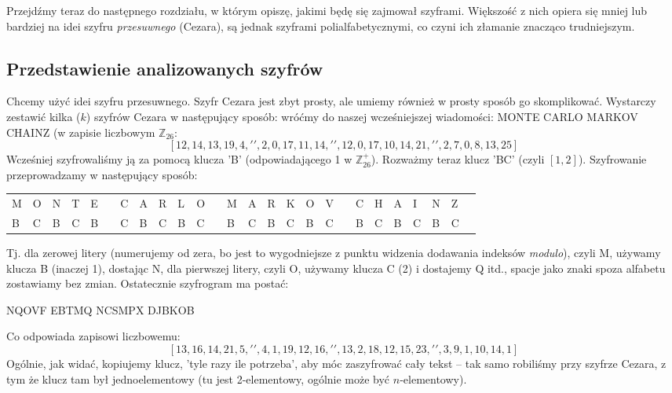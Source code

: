 \documentclass[a4paper]{article}
\theoremstyle{defn}
\theoremstyle{theorem}
\theoremstyle{lemma}
\theoremstyle{cor}
\theoremstyle{fact}
\begin{document}
Przejdźmy teraz do następnego rozdziału, w którym opiszę, jakimi będę się zajmował szyframi. Większość z nich opiera się mniej lub bardziej na idei szyfru \textit{przesuwnego} (Cezara), są jednak szyframi polialfabetycznymi, co czyni ich złamanie znacząco trudniejszym.\\

\subsection{Przedstawienie analizowanych szyfrów}
Chcemy użyć idei szyfru przesuwnego. Szyfr Cezara jest zbyt prosty, ale umiemy również w prosty sposób go skomplikować. Wystarczy zestawić kilka ($k$) szyfrów Cezara w następujący sposób:
wróćmy do naszej wcześniejszej wiadomości: MONTE CARLO MARKOV CHAINZ (w zapisie liczbowym $\mathbb{Z}_{26}$: 
$$[12, 14, 13, 19, 4, ' ', 2, 0, 17, 11, 14, ' ', 12, 0, 17, 10, 14, 21, ' ', 2, 7, 0, 8, 13, 25]$$
Wcześniej szyfrowaliśmy ją za pomocą klucza 'B' (odpowiadającego 1 w $\mathbb{Z}_{26}^+$). Rozważmy teraz klucz 'BC' (czyli $[1, 2]$). Szyfrowanie przeprowadzamy w następujący sposób:
\begin{center}\begin{tabular}{|p{1.5mm}|p{1.5mm}|p{1.5mm}|p{1.5mm}|p{1.5mm}|p{1.5mm}|p{1.5mm}|p{1.5mm}|p{1.5mm}|p{1.5mm}|p{1.5mm}|p{1.5mm}|p{1.5mm}|p{1.5mm}|p{1.5mm}|p{1.5mm}|p{1.5mm}|p{1.5mm}|p{1.5mm}|p{1.5mm}|p{1.5mm}|p{1.5mm}|p{1.5mm}|p{1.5mm}|p{1.5mm}|p{1.5mm}|}
    M & O & N & T & E & & C & A & R & L & O & & M & A & R & K & O & V & & C & H & A & I & N & Z \\
    B & C & B & C & B & & C & B & C & B & C & & B & C & B & C & B & C & & B & C & B & C & B & C 
\end{tabular}
\end{center}
Tj. dla zerowej litery (numerujemy od zera, bo jest to wygodniejsze z punktu widzenia dodawania indeksów \textit{modulo}), czyli M, używamy klucza B (inaczej 1), dostając N, dla pierwszej litery, czyli O, używamy klucza C (2) i dostajemy Q itd., spacje jako znaki spoza alfabetu zostawiamy bez zmian. Ostatecznie szyfrogram ma postać:
\begin{center}
    NQOVF EBTMQ NCSMPX DJBKOB
\end{center}
Co odpowiada zapisowi liczbowemu:
$$ [13, 16, 14, 21, 5, ' ', 4, 1, 19, 12, 16, ' ', 13, 2, 18, 12, 15, 23, ' ', 3, 9, 1, 10, 14, 1]$$
Ogólnie, jak widać, kopiujemy klucz, 'tyle razy ile potrzeba', aby móc zaszyfrować cały tekst – tak samo robiliśmy przy szyfrze Cezara, z tym że klucz tam był jednoelementowy (tu jest 2-elementowy, ogólnie może być $n$-elementowy).\\\\
\end{document}
